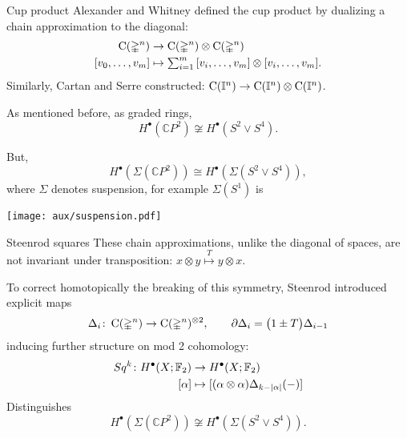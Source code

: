 
\begin{frame}[fragile]{Cup product}
	\pause Alexander and Whitney defined the cup product by dualizing a chain approximation to the diagonal:
	\[
	\begin{split}
	\operatorname{C}(\mathbb{\Delta}^n) &\to
	\operatorname{C}(\mathbb{\Delta}^n) \otimes \operatorname{C}(\mathbb{\Delta}^n) \\
	[v_0, \dots, v_m] &\mapsto
	\textstyle\sum_{i=1}^m \, [v_i, \dots, v_m] \otimes [v_i, \dots, v_m].
	\end{split}
	\]
	\pause Similarly, Cartan and Serre constructed: $\operatorname{C}(\mathbb{I}^n) \to \operatorname{C}(\mathbb{I}^n) \otimes \operatorname{C}(\mathbb{I}^n)$.

	\bigskip \pause
	As mentioned before, as graded rings,
	\[
	H^\bullet(\mathbb{C} P^2) \not\cong H^\bullet(S^2 \vee S^4).
	\]

	\vskip -8pt \pause But,
	\[
	H^\bullet(\Sigma(\mathbb{C} P^2)) \cong H^\bullet(\Sigma(S^2 \vee S^4)),
	\]
	where $\Sigma$ denotes suspension, for example $\Sigma(S^1)$ is
	\begin{center}
		\texttt{[image: aux/suspension.pdf]}
	\end{center}
\end{frame}

\begin{frame}{Steenrod squares}
	\pause These chain approximations, unlike the diagonal of spaces, are \textcolor{pblue}{not} invariant under transposition: $x \otimes y \stackrel{T}{\mapsto} y \otimes x$.
	\begin{center}
	\end{center}

	\medskip \pause To correct homotopically the breaking of this symmetry, Steenrod introduced explicit maps
	\[
	\Delta_i \colon \operatorname{C}(\mathbb{\Delta}^n) \to \operatorname{C}(\mathbb{\Delta}^n)^{\otimes 2},
	\qquad
	\partial \Delta_{i} = \big(1 \pm T \big) \Delta_{i-1}
	\]
	inducing further structure on mod 2 cohomology:
	\[
	\begin{split}
	Sq^k \colon H^\bullet(X; {\mathbb{F}_2}) &\to H^\bullet(X; {\mathbb{F}_2}) \\
	[\alpha] &\mapsto [(\alpha \otimes \alpha) \Delta_{k-|\alpha|}(-)]
	\end{split}
	\]
	\vskip -10pt \pause \textcolor{pblue}{Distinguishes}
	\[
	H^\bullet(\Sigma(\mathbb{C} P^2)) \not\cong H^\bullet(\Sigma(S^2 \vee S^4)).
	\]
\end{frame}

